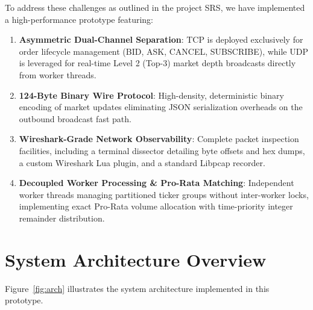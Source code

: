 \documentclass[11pt,a4paper]{article}
\begin{document}
To address these challenges as outlined in the project SRS, we have implemented a high-performance prototype featuring:
\begin{enumerate}
    \item \textbf{Asymmetric Dual-Channel Separation}: TCP is deployed exclusively for order lifecycle management (BID, ASK, CANCEL, SUBSCRIBE), while UDP is leveraged for real-time Level 2 (Top-3) market depth broadcasts directly from worker threads.
    \item \textbf{124-Byte Binary Wire Protocol}: High-density, deterministic binary encoding of market updates eliminating JSON serialization overheads on the outbound broadcast fast path.
    \item \textbf{Wireshark-Grade Network Observability}: Complete packet inspection facilities, including a terminal dissector detailing byte offsets and hex dumps, a custom Wireshark Lua plugin, and a standard Libpcap recorder.
    \item \textbf{Decoupled Worker Processing \& Pro-Rata Matching}: Independent worker threads managing partitioned ticker groups without inter-worker locks, implementing exact Pro-Rata volume allocation with time-priority integer remainder distribution.
\end{enumerate}

\section{System Architecture Overview}

Figure~\ref{fig:arch} illustrates the system architecture implemented in this prototype.
\end{document}
